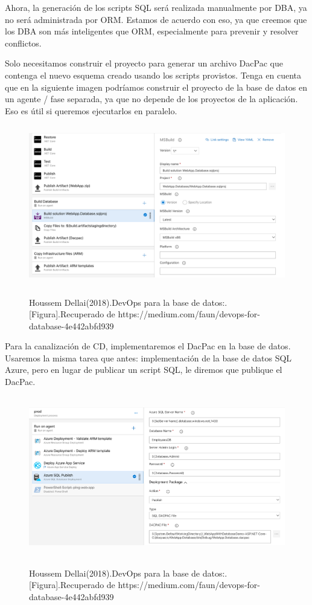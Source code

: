 \documentclass[preprint,12pt]{elsarticle}
\begin{document}
Ahora, la generación de los scripts SQL será realizada manualmente por DBA, ya no será administrada por ORM. Estamos de acuerdo con eso, ya que creemos que los DBA son más inteligentes que ORM, especialmente para prevenir y resolver conflictos.

Solo necesitamos construir el proyecto para generar un archivo DacPac que contenga el nuevo esquema creado usando los scripts provistos. Tenga en cuenta que en la siguiente imagen podríamos construir el proyecto de la base de datos en un agente / fase separada, ya que no depende de los proyectos de la aplicación. Eso es útil si queremos ejecutarlos en paralelo.

\begin{figure}[H]
			\begin{center}
					\includegraphics[width=12cm,height=7cm]{./IMAGENES/analisis7}
			\end{center}
			Houssem Dellai(2018).DevOps para la base de datos:.[Figura].Recuperado de 
https://medium.com/faun/devops-for-database-4e442abfd939
		\end{figure}

Para la canalización de CD, implementaremos el DacPac en la base de datos. Usaremos la misma tarea que antes: implementación de la base de datos SQL Azure, pero en lugar de publicar un script SQL, le diremos que publique el DacPac.

\begin{figure}[H]
			\begin{center}
					\includegraphics[width=12cm,height=7cm]{./IMAGENES/analisis8}
			\end{center}
			Houssem Dellai(2018).DevOps para la base de datos:.[Figura].Recuperado de 
https://medium.com/faun/devops-for-database-4e442abfd939
		\end{figure}
\end{document}
